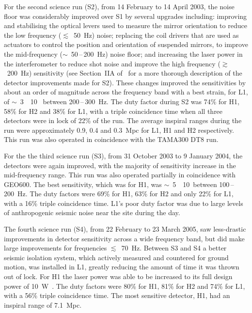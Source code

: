 For the second science run (S2), from 14 February to 14 April 2003, the noise
floor was considerably improved over S1 by several upgrades including: improving
and stabilising the optical levers used to measure the mirror orientation to
reduce the low frequency ($\lesssim$~50~Hz) noise; replacing the coil drivers
that are used as actuators to control the position and orientation of suspended
mirrors, to improve the mid-frequency ($\sim$~50\,--\,200~Hz) noise floor; and
increasing the laser power in the interferometer to reduce shot noise and
improve the high frequency ($\gtrsim$~200~Hz) sensitivity (see
Section~IIA of~\cite{Abbott:2005a} for a more thorough description of
the detector improvements made for S2). These changes improved the
sensitivities by about an order of magnitude across the frequency band
with a best strain, for L1, of $\sim$~3~\texttimes~10~\Hz
between 200\,--\,300~Hz. The duty factor during S2 was 74\% for H1,
58\% for H2 and 38\% for L1, with a triple coincidence time when all
three detectors were in lock of 22\% of the run. The average inspiral
ranges during the run were approximately 0.9, 0.4 and 0.3~Mpc for L1,
H1 and H2 respectively. This run was also operated in coincidence with
the TAMA300 DT8 run. 


For the the third science run (S3), from 31 October 2003 to 9 January 2004,
the detectors were again improved, with the majority of sensitivity increase in
the mid-frequency range. This run was also operated partially in coincidence
with GEO600. The best sensitivity, which was for H1, was
$\sim$~5~\texttimes~10~\Hz between 100\,--\,200~Hz. The duty factors
were 69\% for H1, 63\% for H2 and only 22\% for L1, with a 16\% triple
coincidence time. L1's poor duty factor was due to large levels of anthropogenic
seismic noise near the site during the day.


The fourth science run (S4), from 22 February to 23 March 2005, saw less-drastic
improvements in detector sensitivity across a wide frequency band, but did make
large improvements for frequencies $\lesssim$~70~Hz. Between S3 and S4 a better
seismic isolation system, which actively measured and countered for ground
motion, was installed in L1, greatly reducing the amount of time it was thrown
out of lock. For H1 the laser power was able to be increased to its full design
power of 10~W~\cite{Abbott:2007b}. The duty factors were 80\% for H1, 81\% for
H2 and 74\% for L1, with a 56\% triple coincidence time. The most sensitive
detector, H1, had an inspiral range of 7.1~Mpc.



